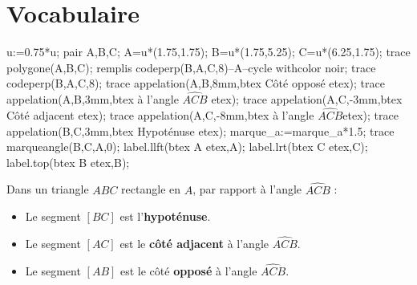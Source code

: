 \section{Vocabulaire}
\begin{definitions}
    \begin{minipage}{0.4\linewidth}
        \begin{Geometrie}[CoinHD={(5u,4.5u)}]
            u:=0.75*u;            
            pair A,B,C;
            A=u*(1.75,1.75);
            B=u*(1.75,5.25);
            C=u*(6.25,1.75);
            trace polygone(A,B,C);
            remplis codeperp(B,A,C,8)--A--cycle withcolor noir;
            trace codeperp(B,A,C,8);
            trace appelation(A,B,8mm,btex Côté opposé etex);
            trace appelation(A,B,3mm,btex à l'angle $\widehat{ACB}$ etex);
            trace appelation(A,C,-3mm,btex Côté adjacent etex);
            trace appelation(A,C,-8mm,btex à l'angle $\widehat{ACB}$etex);
            trace appelation(B,C,3mm,btex Hypoténuse etex);
            marque_a:=marque_a*1.5;    
            trace marqueangle(B,C,A,0);
            label.llft(btex A etex,A);
            label.lrt(btex C etex,C);
            label.top(btex B etex,B);
        \end{Geometrie}
    \end{minipage}
    \begin{minipage}{0.55\linewidth}
        Dans un triangle $ABC$ rectangle en $A$, par rapport à l'angle $\widehat{ACB}$ :
            \begin{itemize}
                \item Le segment $[BC]$ est l'\textbf{hypoténuse}.
                \item Le segment $[AC]$ est le \textbf{côté adjacent} à l'angle $\widehat{ACB}$.
                \item Le segment $[AB]$ est le côté \textbf{opposé} à l'angle $\widehat{ACB}$.
            \end{itemize}
    \end{minipage}
\end{definitions}